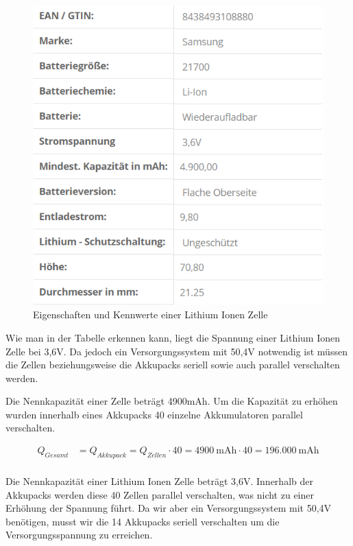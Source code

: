 \begin{figure}[H]
	\begin{center}
		\includegraphics[scale=1.0]{figures/Akku/LithiumIonenZellen.PNG}
		\caption{Eigenschaften und Kennwerte einer Lithium Ionen Zelle\cite{ZellenEigenschaften}}
		\label{fig: Eigenschaften und Kennwerte einer Lithium Ionen Zelle}
	\end{center}
\end{figure}

Wie man in der Tabelle erkennen kann, liegt die Spannung einer Lithium Ionen Zelle bei 3,6V. Da jedoch ein Versorgungssystem mit 50,4V notwendig ist müssen die Zellen beziehungsweise die Akkupacks seriell sowie auch parallel verschalten werden. 

Die Nennkapazität einer Zelle beträgt 4900mAh. Um die Kapazität zu erhöhen wurden innerhalb eines Akkupacks 40 einzelne Akkumulatoren parallel verschalten.

\begin{align*}
Q_{Gesamt} &= Q_{Akkupack}= Q_{Zellen} \cdot 40 = 4900~\mathrm{mAh} \cdot 40= 196.000~\mathrm{mAh}\\
\end{align*}

Die Nennkapazität einer Lithium Ionen Zelle beträgt 3,6V. Innerhalb der Akkupacks werden diese 40 Zellen parallel verschalten, was nicht zu einer Erhöhung der Spannung führt. Da wir aber ein Versorgungssystem mit 50,4V benötigen, musst wir die 14 Akkupacks seriell verschalten um die Versorgungsspannung zu erreichen.

